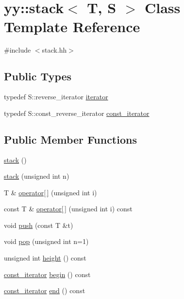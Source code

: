 \hypertarget{classyy_1_1stack}{
\section{yy::stack$<$ T, S $>$ Class Template Reference}
\label{classyy_1_1stack}
}


{\ttfamily \#include $<$stack.hh$>$}

\subsection*{Public Types}
\begin{DoxyCompactItemize}
\item 
typedef S::reverse\_\-iterator \hyperlink{classyy_1_1stack_a959921144f243952520a2178121cbe6f}{iterator}
\item 
typedef S::const\_\-reverse\_\-iterator \hyperlink{classyy_1_1stack_a0cab3a74b0947ce6de68c3520b9229ab}{const\_\-iterator}
\end{DoxyCompactItemize}
\subsection*{Public Member Functions}
\begin{DoxyCompactItemize}
\item 
\hyperlink{classyy_1_1stack_a40ce1d12c5c83edbae23a0a52aaa6d97}{stack} ()
\item 
\hyperlink{classyy_1_1stack_af4277ae80177abc36f242c3646cbcfbe}{stack} (unsigned int n)
\item 
T \& \hyperlink{classyy_1_1stack_a1058b8b7e1a3e0aa7b1e6f2f1a62c234}{operator\mbox{[}$\,$\mbox{]}} (unsigned int i)
\item 
const T \& \hyperlink{classyy_1_1stack_a46778e0ee1fd32a559008d5a261df098}{operator\mbox{[}$\,$\mbox{]}} (unsigned int i) const 
\item 
void \hyperlink{classyy_1_1stack_a5ff563955472eca36f73f6e840df2963}{push} (const T \&t)
\item 
void \hyperlink{classyy_1_1stack_a0800c0a796cade80c3ce9a785dc87564}{pop} (unsigned int n=1)
\item 
unsigned int \hyperlink{classyy_1_1stack_a968303842836fd4e9e3994a4e3984191}{height} () const 
\item 
\hyperlink{classyy_1_1stack_a0cab3a74b0947ce6de68c3520b9229ab}{const\_\-iterator} \hyperlink{classyy_1_1stack_a3939df081955a4ad78e14eeb9b2b5dbf}{begin} () const 
\item 
\hyperlink{classyy_1_1stack_a0cab3a74b0947ce6de68c3520b9229ab}{const\_\-iterator} \hyperlink{classyy_1_1stack_a27ade5b933a4dc8a27960c88addda2a0}{end} () const 
\end{DoxyCompactItemize}
